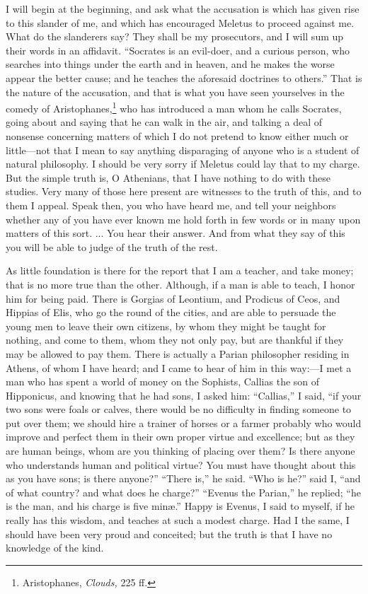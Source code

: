 \documentclass[12pt]{article}
\begin{document}
I will begin at the beginning, and ask what the accusation is which has given
rise to this slander of me, and which has encouraged Meletus to proceed against
me. What do the slanderers say? They shall be my prosecutors, and I will sum up
their words in an affidavit. ``Socrates is an evil-doer, and a curious person,
who searches into things under the earth and in heaven, and he makes the worse
appear the better cause; and he teaches the aforesaid doctrines to others.''
That is the nature of the accusation, and that is what you have seen yourselves
in the comedy of Aristophanes,\footnote{Aristophanes, \textit{Clouds,} 225 ff.}
who has introduced a man whom he calls Socrates, going about and saying that he
can walk in the air, and talking a deal of nonsense concerning matters of which
I do not pretend to know either much or little---not that I mean to say
anything disparaging of anyone who is a student of natural philosophy. I should
be very sorry if Meletus could lay that to my charge. But the simple truth is,
O Athenians, that I have nothing to do with these studies. Very many of those
here present are witnesses to the truth of this, and to them I appeal. Speak
then, you who have heard me, and tell your neighbors whether any of you have
ever known me hold forth in few words or in many upon matters of this sort. ...
You hear their answer. And from what they say of this you will be able to judge
of the truth of the rest.

As little foundation is there for the report that I am a teacher,
and take money; that is no more true than the other. Although, if
a man is able to teach, I honor him for being paid. There is Gorgias
of Leontium, and Prodicus of Ceos, and Hippias of Elis, who go the
round of the cities, and are able to persuade the young men to leave
their own citizens, by whom they might be taught for nothing, and
come to them, whom they not only pay, but are thankful if they may
be allowed to pay them. There is actually a Parian philosopher residing
in Athens, of whom I have heard; and I came to hear of him in this
way:---I met a man who has spent a world of money on the Sophists,
Callias the son of Hipponicus, and knowing that he had sons, I asked
him: ``Callias,'' I said, ``if your two sons were foals or calves, there
would be no difficulty in finding someone to put over them; we should
hire a trainer of horses or a farmer probably who would improve and
perfect them in their own proper virtue and excellence; but as they
are human beings, whom are you thinking of placing over them? Is there
anyone who understands human and political virtue? You must have thought
about this as you have sons; is there anyone?'' ``There is,'' he said.
``Who is he?'' said I, ``and of what country? and what does he charge?''
``Evenus the Parian,'' he replied; ``he is the man, and his charge is
five min{\ae}.'' Happy is Evenus, I said to myself, if he really has this
wisdom, and teaches at such a modest charge. Had I the same, I should
have been very proud and conceited; but the truth is that I have no
knowledge of the kind.
\end{document}
